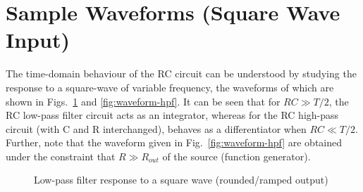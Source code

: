 \section{Sample Waveforms (Square Wave Input)}
The time-domain behaviour of the RC circuit can be understood by studying the response to a square-wave of variable frequency, the waveforms of which are shown in Figs.~\ref{fig:waveform-lpf} and \ref{fig:waveform-hpf}. It can be seen that for $RC\gg T/2$, the RC low-pass filter circuit acts as an integrator, whereas for the RC high-pass circuit (with C and R interchanged), behaves as a differentiator when $RC \ll T/2$. Further, note that the waveform given in Fig.~\ref{fig:waveform-hpf} are obtained under the constraint that $R\gg R_{out}$ of the source (function generator).

\begin{figure}[ht!]
	\centering
	\caption{Low-pass filter response to a square wave (rounded/ramped output)}
	\label{fig:waveform-lpf}
\end{figure}

